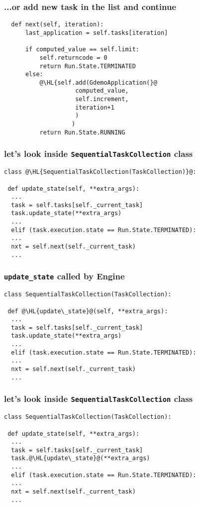 \documentclass[english,serif,mathserif,xcolor=pdftex,dvipsnames,table]{beamer}
\begin{document}
\begin{frame}[fragile]
  \frametitle{...or add new task in the list and continue}
 \begin{lstlisting}
  def next(self, iteration):
      last_application = self.tasks[iteration]

      if computed_value == self.limit:
          self.returncode = 0
          return Run.State.TERMINATED
      else:
          @\HL{self.add(GdemoApplication(}@
                    computed_value,
                    self.increment,
                    iteration+1
                    )
                   )
          return Run.State.RUNNING
  \end{lstlisting}
\end{frame}



\begin{frame}[fragile]
  \frametitle{let's look inside \texttt{SequentialTaskCollection} class}
  \begin{lstlisting}
class @\HL{SequentialTaskCollection(TaskCollection)}@:

 def update_state(self, **extra_args):
  ...
  task = self.tasks[self._current_task]
  task.update_state(**extra_args)
  ...
  elif (task.execution.state == Run.State.TERMINATED):
  ...
  nxt = self.next(self._current_task)
  ...
  \end{lstlisting}
\end{frame}
\begin{frame}[fragile]
  \frametitle{\texttt{update\_state} called by Engine}
  \begin{lstlisting}
class SequentialTaskCollection(TaskCollection):

 def @\HL{update\_state}@(self, **extra_args):
  ...
  task = self.tasks[self._current_task]
  task.update_state(**extra_args)
  ...
  elif (task.execution.state == Run.State.TERMINATED):
  ...
  nxt = self.next(self._current_task)
  ...
  \end{lstlisting}
\end{frame}

\begin{frame}[fragile]
  \frametitle{let's look inside \texttt{SequentialTaskCollection} class}
  \begin{lstlisting}
class SequentialTaskCollection(TaskCollection):

 def update_state(self, **extra_args):
  ...
  task = self.tasks[self._current_task]
  task.@\HL{update\_state}@(**extra_args)
  ...
  elif (task.execution.state == Run.State.TERMINATED):
  ...
  nxt = self.next(self._current_task)
  ...
  \end{lstlisting}
\end{frame}
\end{document}
